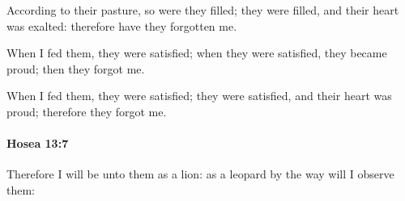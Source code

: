 			\begin{versebox}
					\item[BHS] 
					\item[LXX] 
					\item[ASV] According to their pasture, so were they filled; they were filled, and their heart was exalted: therefore have they forgotten me.
					\item[NIV] When I fed them, they were satisfied; when they were satisfied, they became proud; then they forgot me.
					\item[NRSV] When I fed them, they were satisfied; they were satisfied, and their heart was proud; therefore they forgot me.
			\end{versebox}

		\paragraph{Hosea 13:7} %
			\label{HOSEA-13-7}

			Therefore I will be unto them as a lion: as a leopard by the way will I observe them:

